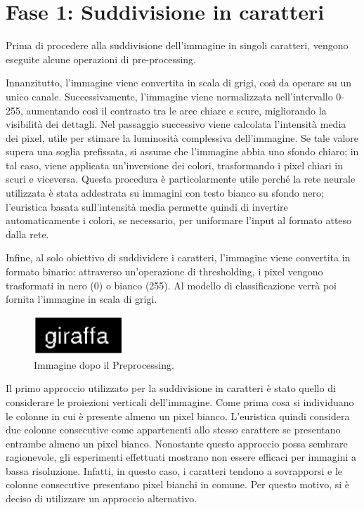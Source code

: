 \section{Fase 1: Suddivisione in caratteri}

Prima di procedere alla suddivisione dell'immagine in singoli caratteri, vengono eseguite alcune operazioni di pre-processing. 

Innanzitutto, l'immagine viene convertita in scala di grigi, così da operare su un unico canale. Successivamente, l'immagine viene normalizzata nell'intervallo 0-255, aumentando così il contrasto tra le aree chiare e scure, migliorando la visibilità dei dettagli. Nel passaggio successivo viene calcolata l'intensità media dei pixel, utile per stimare la luminosità complessiva dell'immagine. Se tale valore supera una soglia prefissata, si assume che l'immagine abbia uno sfondo chiaro; in tal caso, viene applicata un'inversione dei colori, trasformando i pixel chiari in scuri e viceversa. Questa procedura è particolarmente utile perché la rete neurale utilizzata è stata addestrata su immagini con testo bianco su sfondo nero; l'euristica basata sull'intensità media permette quindi di invertire automaticamente i colori, se necessario, per uniformare l'input al formato atteso dalla rete.

Infine, al solo obiettivo di suddividere i caratteri, l'immagine viene convertita in formato binario: attraverso un'operazione di thresholding, i pixel vengono trasformati in nero (0) o bianco (255). Al modello di classificazione verrà poi fornita l'immagine in scala di grigi.
\newline

\begin{figure}[H]
	\centering
	\includegraphics[width=0.3\textwidth]{images/giraffa-bin.png}
	\caption{Immagine dopo il Preprocessing.}
	\label{fig:giraffabin}
\end{figure}

Il primo approccio utilizzato per la suddivisione in caratteri è stato quello di considerare le proiezioni verticali dell'immagine. Come prima cosa si individuano le colonne in cui è presente almeno un pixel bianco.
L'euristica quindi considera due colonne consecutive come appartenenti allo stesso carattere se presentano entrambe almeno un pixel bianco. Nonostante questo approccio possa sembrare ragionevole, gli esperimenti effettuati mostrano non essere efficaci per immagini a bassa risoluzione. Infatti, in questo caso, i caratteri tendono a sovrapporsi e le colonne consecutive presentano pixel bianchi in comune. Per questo motivo, si è deciso di utilizzare un approccio alternativo.
\newline


